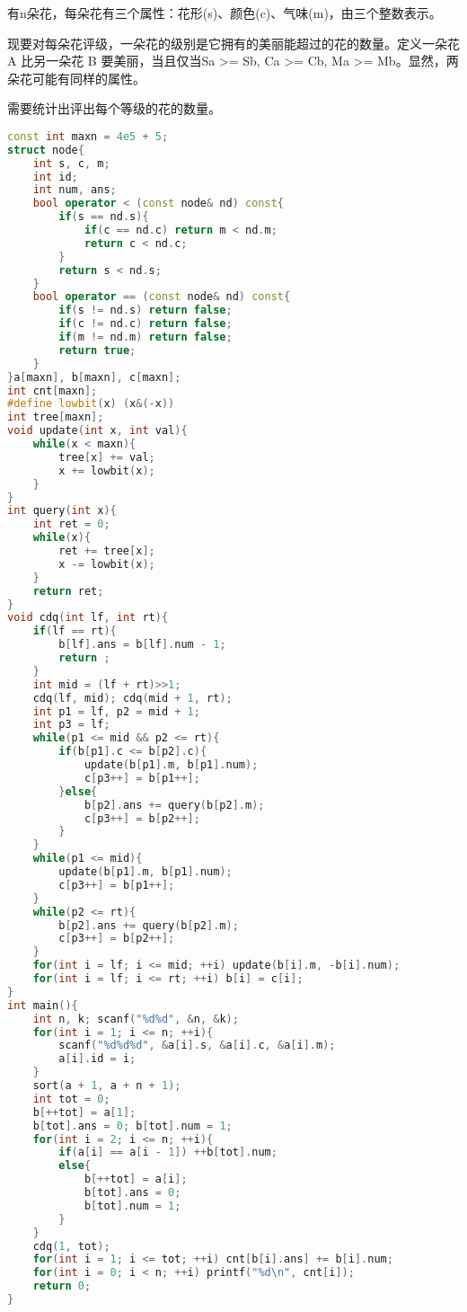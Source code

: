 有n朵花，每朵花有三个属性：花形(s)、颜色(c)、气味(m)，由三个整数表示。

现要对每朵花评级，一朵花的级别是它拥有的美丽能超过的花的数量。定义一朵花 A 比另一朵花 B 要美丽，当且仅当Sa >= Sb, Ca >= Cb, Ma >= Mb。显然，两朵花可能有同样的属性。

需要统计出评出每个等级的花的数量。

\begin{lstlisting}[language=C++]
const int maxn = 4e5 + 5;
struct node{
    int s, c, m;
    int id;
    int num, ans;
    bool operator < (const node& nd) const{
        if(s == nd.s){
            if(c == nd.c) return m < nd.m;
            return c < nd.c;
        }
        return s < nd.s;
    }
    bool operator == (const node& nd) const{
        if(s != nd.s) return false;
        if(c != nd.c) return false;
        if(m != nd.m) return false;
        return true;
    }
}a[maxn], b[maxn], c[maxn];
int cnt[maxn];
#define lowbit(x) (x&(-x))
int tree[maxn];
void update(int x, int val){
    while(x < maxn){
        tree[x] += val;
        x += lowbit(x);
    }
}
int query(int x){
    int ret = 0;
    while(x){
        ret += tree[x];
        x -= lowbit(x);
    }
    return ret;
}
void cdq(int lf, int rt){
    if(lf == rt){
        b[lf].ans = b[lf].num - 1;
        return ;
    }
    int mid = (lf + rt)>>1;
    cdq(lf, mid); cdq(mid + 1, rt);
    int p1 = lf, p2 = mid + 1;
    int p3 = lf;
    while(p1 <= mid && p2 <= rt){
        if(b[p1].c <= b[p2].c){
            update(b[p1].m, b[p1].num);
            c[p3++] = b[p1++];
        }else{
            b[p2].ans += query(b[p2].m);
            c[p3++] = b[p2++];
        }
    }
    while(p1 <= mid){
        update(b[p1].m, b[p1].num);
        c[p3++] = b[p1++];
    }
    while(p2 <= rt){
        b[p2].ans += query(b[p2].m);
        c[p3++] = b[p2++];
    }
    for(int i = lf; i <= mid; ++i) update(b[i].m, -b[i].num);
    for(int i = lf; i <= rt; ++i) b[i] = c[i];
}
int main(){
    int n, k; scanf("%d%d", &n, &k);
    for(int i = 1; i <= n; ++i){
        scanf("%d%d%d", &a[i].s, &a[i].c, &a[i].m);
        a[i].id = i;
    }
    sort(a + 1, a + n + 1);
    int tot = 0;
    b[++tot] = a[1];
    b[tot].ans = 0; b[tot].num = 1;
    for(int i = 2; i <= n; ++i){
        if(a[i] == a[i - 1]) ++b[tot].num;
        else{
            b[++tot] = a[i];
            b[tot].ans = 0;
            b[tot].num = 1;
        }
    }
    cdq(1, tot);
    for(int i = 1; i <= tot; ++i) cnt[b[i].ans] += b[i].num;
    for(int i = 0; i < n; ++i) printf("%d\n", cnt[i]);
    return 0;
}
\end{lstlisting}

